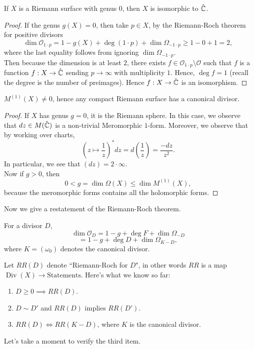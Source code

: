 \documentclass{article}
\begin{document}
{\begin{proposition}
    If $X$ is a Riemann surface with genus $0$, then $X$ is isomorphic to $\hat{\mathbb{C}}$.
\end{proposition}

\begin{proof}
    If the genus $g(X) = 0$, then take $p \in X$, by the Riemann-Roch theorem for positive divisors
    \[\dim \mathcal{O}_{1 \cdot p} = 1 - g(X) + \deg(1 \cdot p) + \dim \Omega_{-1 \cdot p} \geq 1 - 0 + 1 = 2,\]
    where the last equality follows from ignoring $ \dim \Omega_{-1 \cdot p}$.\\
    
    Then because the dimension is at least $2$, there exists $f \in \mathcal{O}_{1 \cdot p} \setminus \mathcal{O}$ such that $f$ is a function $f: X \to \hat{\mathbb{C}}$ sending $p \to \infty$ with multiplicity $1$. Hence, $\deg f = 1$ (recall the degree is the number of preimages). Hence $f: X \to \hat{\mathbb{C}}$ is an isomorphism.
\end{proof}


\begin{proposition}
    $M^{(1)}(X) \neq 0$, hence any compact Riemann surface has a canonical divisor.
\end{proposition}

\begin{proof}
    If $X$ has genus $g = 0$, it is the Riemann sphere. In this case, we observe that $dz \in M(\hat{\mathbb{C}})$ is a non-trivial Meromorphic $1$-form. Moreover, we observe that by working over charts,
    \[(z \mapsto \frac{1}{z})^* dz = d(\frac{1}{z}) = \frac{-dz}{z^2}.\]
    In particular, we see that $(dz) = 2 \cdot \infty$.\\

    Now if $g > 0$, then 
    \[0 < g = \dim \Omega(X) \leq \dim M^{(1)}(X),\]
    because the meromorphic forms contains all the holomorphic forms.
\end{proof}

Now we give a restatement of the Riemann-Roch theorem.
\begin{theorem}
For a divisor $D$, 
\[\dim \mathcal{O}_D = 1 - g + \deg F + \dim \Omega_{-D} \]
\[= 1 - g + \deg D + \dim \Omega_{K - D},\]
where $K = (\omega_0)$ denotes the canonical divisor.
\end{theorem}

Let $RR(D)$ denote ``Riemann-Roch for $D$", in other words $RR$ is a map $\operatorname{Div}(X) \to \text{Statements}$. Here's what we know so far:
    \begin{enumerate}
        \item $D \geq 0 \implies RR(D)$.
        \item $D \sim D'$ and $RR(D)$ implies $RR(D')$.
        \item $RR(D) \iff RR(K - D)$, where $K$ is the canonical divisor.
    \end{enumerate}
Let's take a moment to verify the third item.

}
\end{document}
